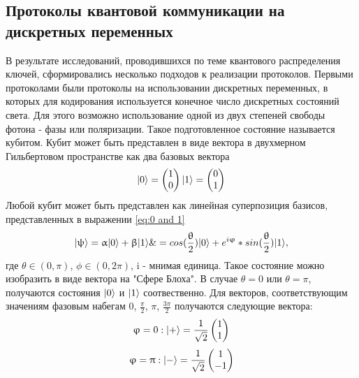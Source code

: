 \subsection{Протоколы квантовой коммуникации на дискретных переменных }\label{sec:ch1/sect2/DVQKD prot}
 В результате исследований, проводившихся по теме квантового распределения ключей, сформировались несколько подходов к реализации протоколов. Первыми протоколами были протоколы на использовании дискретных переменных, в которых для кодирования  используется конечное число дискретных состояний света. Для этого возможно использование одной из двух степеней свободы фотона - фазы или поляризации. Такое подготовленное состояние называется кубитом. Кубит может быть представлен в виде вектора в двухмерном Гильбертовом пространстве как два базовых вектора
\begin{equation}
  \lvert0\rangle       =  \begin{pmatrix} 1 \\ 0 \end{pmatrix}
  \lvert1\rangle       =  \begin{pmatrix} 0 \\ 1 \end{pmatrix}
\label{eq:0 and 1}
\end{equation}
Любой кубит может быть представлен как линейная суперпозиция базисов, представленных в выражении \ref{eq:0 and 1}
\begin{equation}
    \lvert\uppsi\rangle      = \upalpha\lvert0\rangle + \upbeta\lvert1\rangle \&=  cos(\frac{\uptheta}{2})\lvert0\rangle + e^{i\upvarphi} * sin(\frac{\uptheta}{2})\lvert1\rangle, 
\label{eq: superpos}
\end{equation}
где $\theta \in (0, \pi)$, $\phi \in (0, 2\pi)$, i - мнимая единица. Такое состояние можно изобразить в виде вектора на "Сфере Блоха". В случае $\theta = 0 $ или $\theta = \pi $, получаются состояния $\lvert0\rangle$ и $\lvert1\rangle$ соотвественно. Для векторов, соответствующим значениям фазовым набегам {0, $\frac{\pi}{2}$, $\pi$, $\frac{3\pi}{2}$} получаются следующие вектора:
\begin{equation}
  \upvarphi = 0 : \lvert+\rangle= \frac{1}{\sqrt{2}} \begin{pmatrix} 1 \\ 1 \end{pmatrix}
\label{eq:0 phase vector}
\end{equation}
\begin{equation}
  \upvarphi = \uppi : \lvert-\rangle= \frac{1}{\sqrt{2}} \begin{pmatrix} 1 \\ -1 \end{pmatrix}
\label{eq:pi phase vector}
\end{equation}
